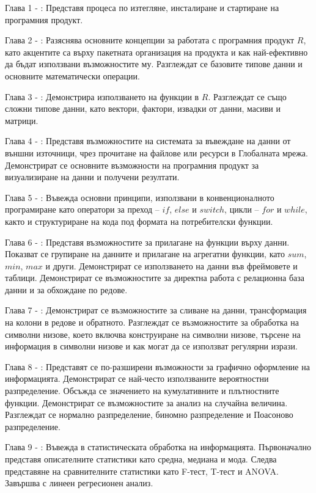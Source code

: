Глава 1 - : Представя процеса по изтегляне, инсталиране и стартиране на програмния продукт.

Глава 2 - : Разяснява основните концепции за работата с програмния продукт $R$, като акцентите са върху пакетната организация на продукта и как най-ефективно да бъдат използвани възможностите му. Разглеждат се базовите типове данни и основните математически операции. 

Глава 3 - : Демонстрира използването на функции в $R$. Разглеждат се също сложни типове данни, като вектори, фактори, извадки от данни, масиви и матрици. 

Глава 4 - : Представя възможностите на системата за въвеждане на данни от външни източници, чрез прочитане на файлове или ресурси в Глобалната мрежа. Демонстрират се основните възможности на програмния продукт за визуализиране на данни и получени резултати.  

Глава 5 - : Въвежда основни принципи, използвани в конвенционалното програмиране като оператори за преход – $if$, $else$ и $switch$, цикли – $for$ и $while$, както и структуриране на кода под формата на потребителски функции.

Глава 6 - : Представя възможностите за прилагане на функции върху данни. Показват се групиране на данните и прилагане на агрегатни функции, като $sum$, $min$, $max$ и други. Демонстрират се използването на данни във фреймовете и таблици. Демонстрират се възможностите за директна работа с релационна база данни и за обхождане по редове.

Глава 7 - : Демонстрират се възможностите за сливане на данни, трансформация на колони в редове и обратното. Разглеждат се възможностите за обработка на символни низове, което включва конструиране на символни низове, търсене на информация в символни низове и как могат да се използват регулярни изрази. 

Глава 8 - : Представят се по-разширени възможности за графично оформление на информацията. Демонстрират се най-често използваните вероятностни разпределение. Обсъжда се значението на кумулативните и плътностните функции. Демонстрират се възможностите за анализ на случайна величина. Разглеждат се нормално разпределение, биномно разпределение и Поасоново разпределение.

Глава 9 - : Въвежда в статистическата обработка на информацията. Първоначално представя описателните статистики като средна, медиана и мода. Следва представяне на сравнителните статистики като F-тест, T-тест и ANOVA. Завършва с линеен регресионен анализ. 

